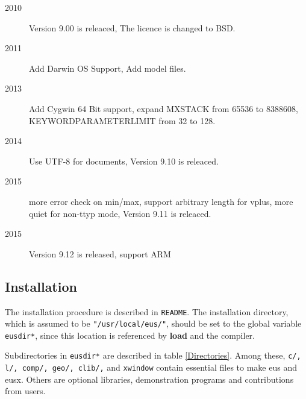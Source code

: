 \begin{description}
\item[2010] Version 9.00 is releaced, The licence is changed to BSD.
\item[2011] Add Darwin OS Support, Add model files.
\item[2013] Add Cygwin 64 Bit support, expand MXSTACK from 65536 to 8388608, KEYWORDPARAMETERLIMIT from 32 to 128.
\item[2014] Use UTF-8 for documents, Version 9.10 is releaced.
\item[2015] more error check on min/max, support arbitrary length for vplus, more quiet for non-ttyp mode, Version 9.11 is releaced.
\item[2015] Version 9.12 is released, support ARM
\end{description}

\subsection{Installation}
The installation procedure is described in {\tt README}.
The installation directory, which is assumed to be {\tt "/usr/local/eus/"},
should be set to the global variable 
{\tt *eusdir*}, since this location is referenced
by {\bf load} and the compiler.

Subdirectories in  {\tt *eusdir*} are described in table \ref{Directories}.
Among these, 
{\tt c/, l/, comp/, geo/, clib/,} and {\tt xwindow} contain essential
files to make eus and eusx. Others are optional libraries, demonstration
programs and contributions from users.

